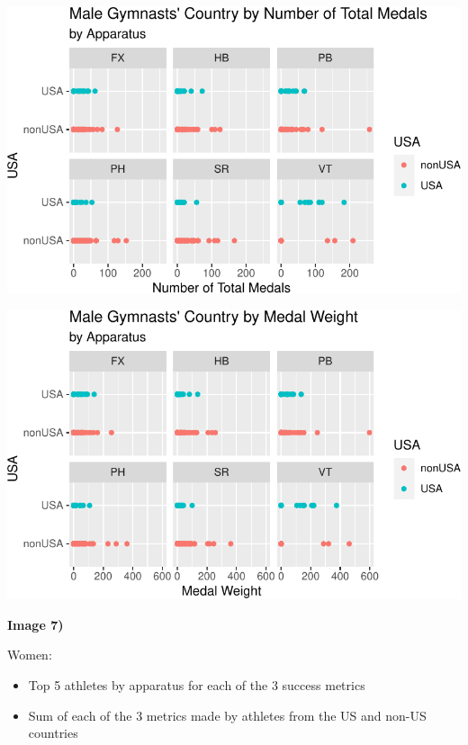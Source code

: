 \documentclass[
  10.5pt,
  letterpaper,
  DIV=11,
  numbers=noendperiod]{scrartcl}
\begin{document}
\includegraphics{Main_files/figure-pdf/unnamed-chunk-6-2.pdf}

\includegraphics{Main_files/figure-pdf/unnamed-chunk-6-3.pdf}

\textbf{Image 7)}

Women:

\begin{itemize}
\item
  Top 5 athletes by apparatus for each of the 3 success metrics
\item
  Sum of each of the 3 metrics made by athletes from the US and non-US
  countries
\end{itemize}
\end{document}
